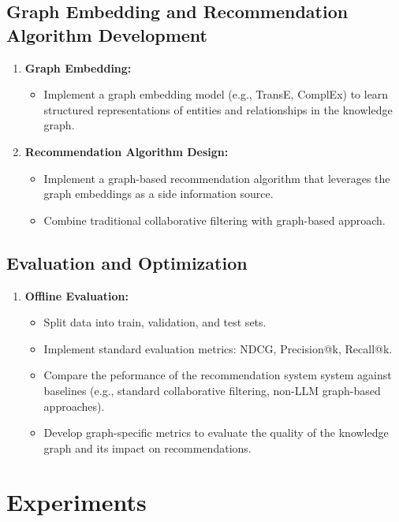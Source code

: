 \documentclass{article}
\begin{document}
\subsection{Graph Embedding and Recommendation Algorithm Development}
\begin{enumerate}
    \item \textbf{Graph Embedding:}
    \begin{itemize}
        \item Implement a graph embedding model (e.g., TransE, ComplEx) to learn structured representations of entities and relationships in the knowledge graph.
    \end{itemize}
    
    \item \textbf{Recommendation Algorithm Design:}
    \begin{itemize}
        \item Implement a graph-based recommendation algorithm that leverages the graph embeddings as a side information source.
        \item Combine traditional collaborative filtering with graph-based approach.
    \end{itemize}
    
\end{enumerate}

\subsection{Evaluation and Optimization}
\begin{enumerate}
    \item \textbf{Offline Evaluation:}
    \begin{itemize}
        \item Split  data into train, validation, and test sets.
        \item Implement standard evaluation metrics: NDCG, Precision@k, Recall@k.
        \item Compare the peformance of the recommendation system system against baselines (e.g., standard collaborative filtering, non-LLM graph-based approaches).
        \item Develop graph-specific metrics to evaluate the quality of the knowledge graph and its impact on recommendations.
    \end{itemize}
    
\end{enumerate}

\section{Experiments}
\end{document}

